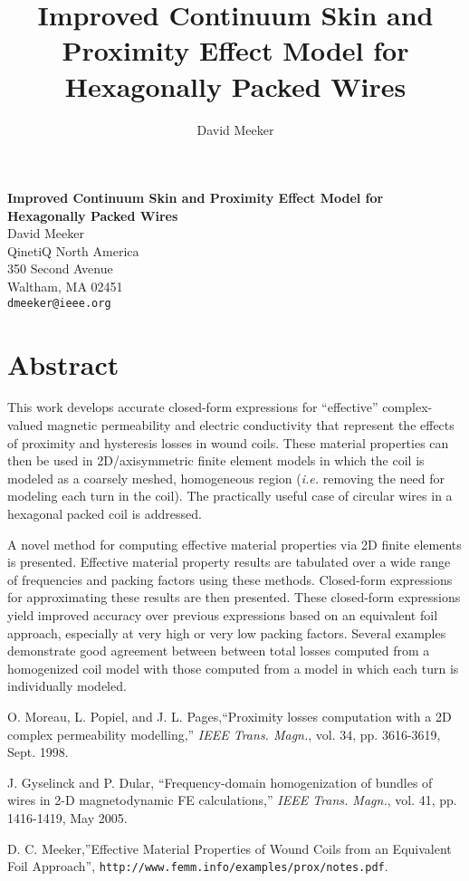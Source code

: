 \title{Improved Continuum Skin and Proximity Effect Model for Hexagonally Packed Wires}
\author{David Meeker} 

\begin{center}

\textbf{\Large Improved Continuum Skin and Proximity Effect Model for Hexagonally Packed Wires}\\
\vspace{10mm}
{\large David Meeker}\\
QinetiQ North America\\
350 Second Avenue \\
Waltham, MA 02451 \\
{\tt dmeeker@ieee.org}

\end{center}

\section*{Abstract}

This work develops accurate closed-form expressions for ``effective'' complex-valued magnetic permeability and electric conductivity that represent the effects of proximity and hysteresis losses in wound coils. These material properties can then be used in 2D/axisymmetric finite element models in which the coil is modeled as a coarsely meshed, homogeneous region ({\em i.e.} removing the need for modeling each turn in the coil). The practically useful case of circular wires in a hexagonal packed coil is addressed.

A novel method for computing effective material properties via 2D finite elements is presented. Effective material property results are tabulated over a wide range of frequencies and packing factors using these methods. Closed-form expressions for approximating these results are then presented. These closed-form expressions yield improved accuracy over previous expressions based on an equivalent foil approach, especially at very high or very low packing factors. Several examples demonstrate good agreement between between total losses computed from a homogenized coil model with those computed from a model in which each turn is individually modeled.


\begin{thebibliography}{10}

 O. Moreau, L. Popiel, and J. L. Pages,``Proximity losses computation with a 2D complex permeability modelling,'' \emph{IEEE Trans. Magn.}, vol. 34, pp. 3616-3619, Sept. 1998.

 J. Gyselinck and P. Dular, ``Frequency-domain homogenization of bundles of wires in 2-D magnetodynamic FE calculations,'' \emph{IEEE Trans. Magn.}, vol. 41, pp. 1416-1419, May 2005.

D. C. Meeker,''Effective Material Properties of Wound Coils from an Equivalent Foil Approach'', {\tt http://www.femm.info/examples/prox/notes.pdf}.

\end{thebibliography}
